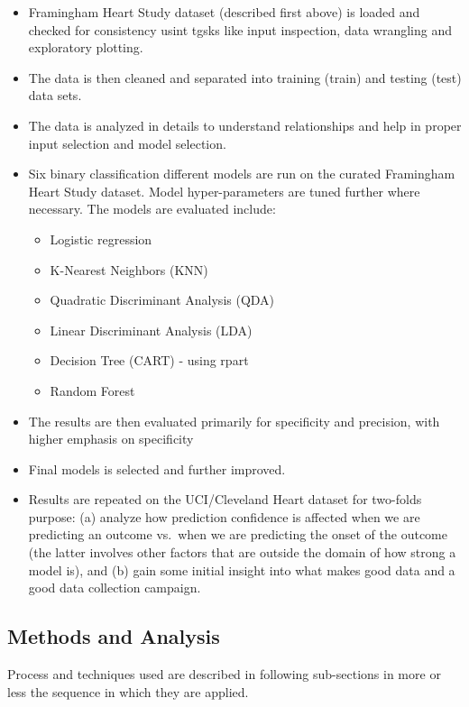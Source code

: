 \documentclass[]{article}
\providecommand{\tightlist}{%
  \setlength{\itemsep}{0pt}\setlength{\parskip}{0pt}}
\begin{document}
\begin{itemize}
\tightlist
\item
  Framingham Heart Study dataset (described first above) is loaded and
  checked for consistency usint tgsks like input inspection, data
  wrangling and exploratory plotting.
\item
  The data is then cleaned and separated into training (train) and
  testing (test) data sets.
\item
  The data is analyzed in details to understand relationships and help
  in proper input selection and model selection.
\item
  Six binary classification different models are run on the curated
  Framingham Heart Study dataset. Model hyper-parameters are tuned
  further where necessary. The models are evaluated include:

  \begin{itemize}
  \tightlist
  \item
    Logistic regression
  \item
    K-Nearest Neighbors (KNN)
  \item
    Quadratic Discriminant Analysis (QDA)
  \item
    Linear Discriminant Analysis (LDA)
  \item
    Decision Tree (CART) - using rpart
  \item
    Random Forest
  \end{itemize}
\item
  The results are then evaluated primarily for specificity and
  precision, with higher emphasis on specificity
\item
  Final models is selected and further improved.
\item
  Results are repeated on the UCI/Cleveland Heart dataset for two-folds
  purpose: (a) analyze how prediction confidence is affected when we are
  predicting an outcome vs.~when we are predicting the onset of the
  outcome (the latter involves other factors that are outside the domain
  of how strong a model is), and (b) gain some initial insight into what
  makes good data and a good data collection campaign.
\end{itemize}

\subsection{Methods and Analysis}\label{methods-and-analysis}

Process and techniques used are described in following sub-sections in
more or less the sequence in which they are applied.
\end{document}
